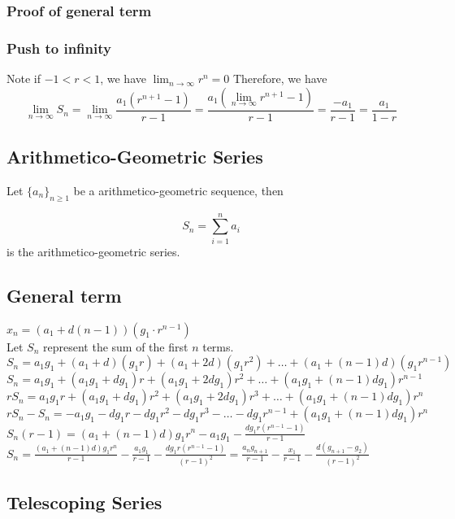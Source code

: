 \documentclass{article}
\begin{document}
\subsubsection{Proof of general term}
\vspace{30px}
\subsubsection{Push to infinity}

Note if $-1<r<1$, we have $\lim_{n \to \infty} r^n=0$
Therefore, we have $$\lim_{n \to \infty} S_n = \lim_{n \to \infty} \frac{a_1(r^{n+1}-1)}{r-1} = \frac{a_1(\lim_{n \to \infty} r^{n+1}-1)}{r-1} = \frac{-a_1}{r-1} = \frac{a_1}{1-r}$$

\subsection{Arithmetico-Geometric Series}

Let $\{a_n\}_{n\ge1}$ be a arithmetico-geometric sequence, then 

$$S_n=\sum_{i=1}^{n}a_i$$ 
is the arithmetico-geometric series.

\subsection{General term}
$x_n=(a_1+d(n-1))(g_1\cdot r^{n-1})$\\
Let $S_n$ represent the sum of the first $n$ terms. \\
$S_n=a_1g_1+(a_1+d)(g_1r)+(a_1+2d)(g_1r^2)+\ldots+(a_1+(n-1)d)(g_1r^{n-1})$\\
$S_n=a_1g_1+(a_1g_1+dg_1)r+(a_1g_1+2dg_1)r^2+\ldots+(a_1g_1+(n-1)dg_1)r^{n-1}$\\
$rS_n=a_1g_1r+(a_1g_1+dg_1)r^2+(a_1g_1+2dg_1)r^3+\ldots+(a_1g_1+(n-1)dg_1)r^{n}$\\
$rS_n-S_n=-a_1g_1-dg_1r-dg_1r^2-dg_1r^3-\ldots-dg_1r^{n-1}+(a_1g_1+(n-1)dg_1)r^n$\\
$S_n(r-1)=(a_1+(n-1)d)g_1r^n-a_1g_1-\frac{dg_1r(r^{n-1}-1)}{r-1}$\\
$S_n=\frac{(a_1+(n-1)d)g_1r^n}{r-1}-\frac{a_1g_1}{r-1}-\frac{dg_1r(r^{n-1}-1)}{(r-1)^2}=\frac{a_ng_{n+1}}{r-1}-\frac{x_1}{r-1}-\frac{d(g_{n+1}-g_2)}{(r-1)^2}$

\subsection{Telescoping Series}
\end{document}
